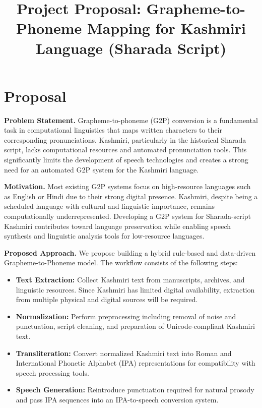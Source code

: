 \documentclass[11pt]{article}
\title{Project Proposal: Grapheme-to-Phoneme Mapping for Kashmiri Language (Sharada Script)}
\begin{document}
\maketitle


\section{Proposal}

\textbf{Problem Statement.}
Grapheme-to-phoneme (G2P) conversion is a fundamental task in computational linguistics that maps written characters to their corresponding pronunciations. Kashmiri, particularly in the historical Sharada script, lacks computational resources and automated pronunciation tools. This significantly limits the development of speech technologies and creates a strong need for an automated G2P system for the Kashmiri language.

\textbf{Motivation.}
Most existing G2P systems focus on high-resource languages such as English or Hindi due to their strong digital presence. Kashmiri, despite being a scheduled language with cultural and linguistic importance, remains computationally underrepresented. Developing a G2P system for Sharada-script Kashmiri contributes toward language preservation while enabling speech synthesis and linguistic analysis tools for low-resource languages.

\textbf{Proposed Approach.}
We propose building a hybrid rule-based and data-driven Grapheme-to-Phoneme model. The workflow consists of the following steps:

\begin{itemize}
    \item \textbf{Text Extraction:} Collect Kashmiri text from manuscripts, archives, and linguistic resources. Since Kashmiri has limited digital availability, extraction from multiple physical and digital sources will be required.
    
    \item \textbf{Normalization:} Perform preprocessing including removal of noise and punctuation, script cleaning, and preparation of Unicode-compliant Kashmiri text.
    
    \item \textbf{Transliteration:} Convert normalized Kashmiri text into Roman and International Phonetic Alphabet (IPA) representations for compatibility with speech processing tools.
    
    \item \textbf{Speech Generation:} Reintroduce punctuation required for natural prosody and pass IPA sequences into an IPA-to-speech conversion system.
\end{itemize}
\end{document}
